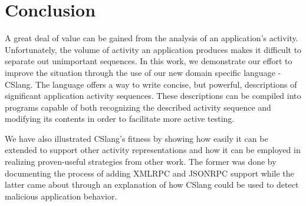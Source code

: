\section{Conclusion}
\label{sec:Conclusion}
%
%

A great deal of value can be gained from the analysis of an application's
activity.
Unfortunately,
the volume of activity
an application produces
makes it difficult
to separate out
unimportant sequences.
In this work,
we demonstrate our effort
to improve the situation
through the use of
our new domain specific language
- CSlang.
The language offers
a way to write concise,
but powerful,
descriptions of
significant application activity sequences.
These descriptions
can be compiled
into programs capable of
both recognizing the described activity
sequence
and modifying its contents in order to
facilitate more active testing.

We have also
illustrated CSlang's fitness
by showing
how easily it
can be extended
to support other activity
representations
and how it can be employed
in realizing proven-useful
strategies from other work.
The former was done
by documenting the process
of adding XMLRPC and JSONRPC support
while the latter came about
through an explanation
of how CSlang could be used to
detect malicious application behavior.


